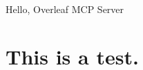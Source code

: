 \documentclass[]{article}
\title{}
\author{}
\begin{document}
	
	Hello, Overleaf MCP Server

\maketitle

\begin{abstract}

\end{abstract}

\section{This is a test.}
\end{document}
